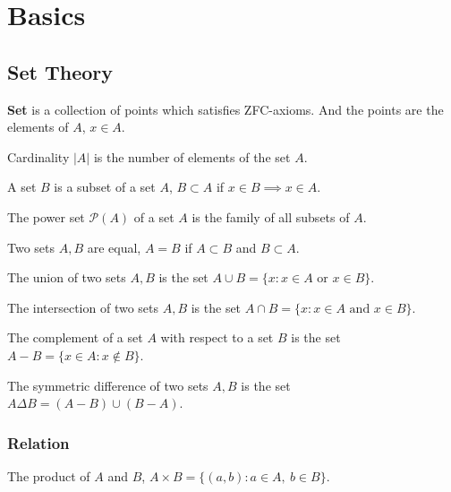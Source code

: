 \chapter{Basics}
\section{Set Theory}
\textbf{Set} is a collection of points which satisfies ZFC-axioms.
And the points are the elements of $A$, $x \in A$.

\begin{definition}[cardinality]
	Cardinality $|A|$ is the number of elements of the set $A$.
\end{definition}

\begin{definition}[subset]
	A set $B$ is a subset of a set $A$, $B \subset A$ if $x \in B \implies x \in A$.
\end{definition}

\begin{definition}
	The power set $\mathcal{P}(A)$ of a set $A$ is the family of all subsets of $A$.
\end{definition}

\begin{definition}[equal]
	Two sets $A,B$ are equal, $A = B$ if $A \subset B$ and $B \subset A$.
\end{definition}

\begin{definition}[union]
	The union of two sets $A,B$ is the set $A \cup B = \{ x : x \in A \text{ or } x \in B\}$.
\end{definition}

\begin{definition}[intersection]
	The intersection of two sets $A,B$ is the set $A \cap B = \{ x : x \in A \text{ and } x \in B\}$.
\end{definition}

\begin{definition}[complement]
	The complement of a set $A$ with respect to a set $B$ is the set $A-B = \{ x \in A : x \notin B\}$.
\end{definition}

\begin{definition}
	The symmetric difference of two sets $A,B$ is the set $A \Delta B = (A-B) \cup (B-A)$.
\end{definition}

\subsection{Relation}
\begin{definition}[product]
	The product of $A$ and $B$, $A \times B = \{ (a,b) : a \in A,\ b \in B\}$.
\end{definition}

